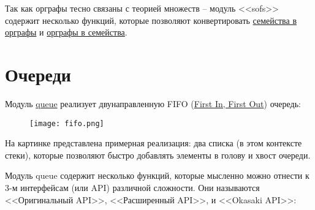 Так как орграфы тесно связаны с теорией множеств \---  модуль <<sofs>> содержит несколько функций, которые позволяют конвертировать \href{http://erldocs.com/R15B/stdlib/sofs.html\#family\_to\_digraph/2}{семейства в орграфы} и \href{http://erldocs.com/R15B/stdlib/sofs.html\#digraph\_to\_family/2}{орграфы в семейства}.
\section{Очереди}
\label{queues}
Модуль \href{http://erldocs.com/R15B/stdlib/queue.html}{queue} реализует двунаправленную FIFO (\href{http://en.wikipedia.org/wiki/FIFO\_(computing)}{First In, First Out}) очередь:
\begin{figure}[h!]
    \centering
    \texttt{[image: fifo.png]}
\end{figure}
На картинке представлена примерная реализация: два списка (в этом контексте стеки), которые позволяют быстро добавлять элементы в голову и хвост очереди.

Модуль queue содержит несколько функций, которые мысленно можно отнести к 3\--м интерфейсам (или API) различной сложности.
Они называются <<Оригинальный API>>, <<Расширенный API>>, и <<Okasaki API>>:
\\

